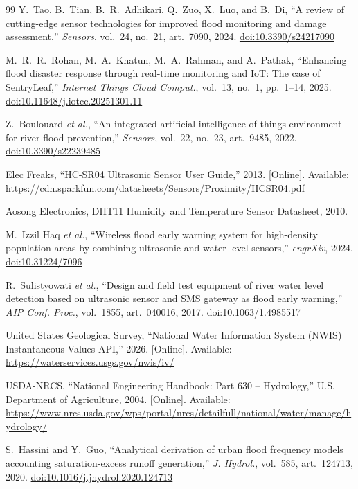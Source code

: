 \documentclass[5p,twocolumn]{elsarticle}
\begin{document}
\begin{thebibliography}{99}
 Y.~Tao, B.~Tian, B.~R.~Adhikari, Q.~Zuo, X.~Luo, and B.~Di, ``A review of cutting-edge sensor technologies for improved flood monitoring and damage assessment,'' \textit{Sensors}, vol.~24, no.~21, art.~7090, 2024. \href{https://doi.org/10.3390/s24217090}{doi:10.3390/s24217090}

 M.~R.~R.~Rohan, M.~A.~Khatun, M.~A.~Rahman, and A.~Pathak, ``Enhancing flood disaster response through real-time monitoring and IoT: The case of SentryLeaf,'' \textit{Internet Things Cloud Comput.}, vol.~13, no.~1, pp.~1--14, 2025. \href{https://doi.org/10.11648/j.iotcc.20251301.11}{doi:10.11648/j.iotcc.20251301.11}

 Z.~Boulouard \textit{et al.}, ``An integrated artificial intelligence of things environment for river flood prevention,'' \textit{Sensors}, vol.~22, no.~23, art.~9485, 2022. \href{https://doi.org/10.3390/s22239485}{doi:10.3390/s22239485}

 Elec Freaks, ``HC-SR04 Ultrasonic Sensor User Guide,'' 2013. [Online]. Available: \url{https://cdn.sparkfun.com/datasheets/Sensors/Proximity/HCSR04.pdf}

 Aosong Electronics, DHT11 Humidity and Temperature Sensor Datasheet, 2010.

 M.~Izzil Haq \textit{et al.}, ``Wireless flood early warning system for high-density population areas by combining ultrasonic and water level sensors,'' \textit{engrXiv}, 2024. \href{https://doi.org/10.31224/7096}{doi:10.31224/7096}

 R.~Sulistyowati \textit{et al.}, ``Design and field test equipment of river water level detection based on ultrasonic sensor and SMS gateway as flood early warning,'' \textit{AIP Conf. Proc.}, vol.~1855, art.~040016, 2017. \href{https://doi.org/10.1063/1.4985517}{doi:10.1063/1.4985517}

 United States Geological Survey, ``National Water Information System (NWIS) Instantaneous Values API,'' 2026. [Online]. Available: \url{https://waterservices.usgs.gov/nwis/iv/}

 USDA-NRCS, ``National Engineering Handbook: Part 630 -- Hydrology,'' U.S. Department of Agriculture, 2004. [Online]. Available: \url{https://www.nrcs.usda.gov/wps/portal/nrcs/detailfull/national/water/manage/hydrology/}

 S.~Hassini and Y.~Guo, ``Analytical derivation of urban flood frequency models accounting saturation-excess runoff generation,'' \textit{J. Hydrol.}, vol.~585, art.~124713, 2020. \href{https://doi.org/10.1016/j.jhydrol.2020.124713}{doi:10.1016/j.jhydrol.2020.124713}


\end{thebibliography}
\end{document}
